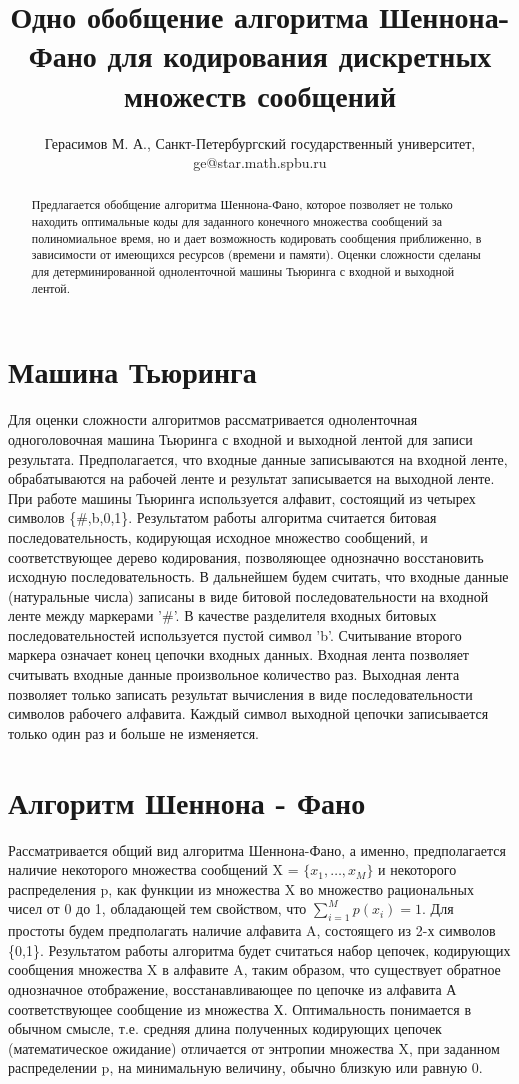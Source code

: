\documentclass{spisok-article}
\title{Одно обобщение алгоритма Шеннона-Фано для кодирования дискретных множеств сообщений}
\author{Герасимов М. А.,
  Санкт-Петербургский государственный университет,
  ge@star.math.spbu.ru
}
\begin{document}
\maketitle
    
\begin{abstract}
Предлагается обобщение алгоритма Шеннона-Фано, которое позволяет не только находить оптимальные коды для заданного конечного множества сообщений за полиномиальное время, но и дает возможность кодировать сообщения приближенно, в зависимости от имеющихся ресурсов (времени и памяти). Оценки сложности сделаны для детерминированной одноленточной машины Тьюринга с входной и выходной лентой.
\end{abstract}

\section{Машина Тьюринга}
Для оценки сложности алгоритмов рассматривается одноленточная одноголовочная машина Тьюринга с входной и выходной лентой для записи результата. Предполагается, что входные данные записываются на входной ленте, обрабатываются на рабочей ленте и результат записывается на выходной ленте. При работе машины Тьюринга используется алфавит, состоящий из четырех символов \{\#,b,0,1\}. Результатом работы алгоритма считается битовая последовательность, кодирующая исходное множество сообщений, и соответствующее дерево кодирования, позволяющее однозначно восстановить исходную последовательность. В дальнейшем будем считать, что входные данные (натуральные числа) записаны в виде битовой последовательности на входной ленте между маркерами '\#'. В качестве разделителя входных битовых последовательностей используется пустой символ 'b'. Считывание второго маркера означает конец цепочки входных данных. Входная лента позволяет считывать входные данные произвольное количество раз. Выходная лента позволяет только записать результат вычисления  в виде последовательности символов рабочего алфавита. Каждый символ выходной цепочки записывается только один раз и больше не изменяется.


\section{Алгоритм Шеннона - Фано}
Рассматривается общий вид алгоритма Шеннона-Фано, а именно, предполагается наличие некоторого множества сообщений X = $\{x_{1} ,…,x_{M} \}$ и некоторого распределения p, как функции из множества X во множество рациональных чисел от 0 до 1, обладающей тем свойством, что $\sum _{i=1}^M p(x_{i}) = 1$. Для простоты будем предполагать наличие алфавита A, состоящего из 2-х символов \{0,1\}. Результатом работы алгоритма будет считаться набор цепочек, кодирующих сообщения множества X в алфавите A, таким образом, что существует обратное   однозначное отображение, восстанавливающее по цепочке из алфавита А соответствующее сообщение из множества Х. Оптимальность понимается в обычном смысле, т.е. средняя длина полученных кодирующих цепочек (математическое ожидание) отличается от энтропии множества X, при заданном распределении p, на минимальную величину, обычно близкую или равную 0.  
\newline
\end{document}
